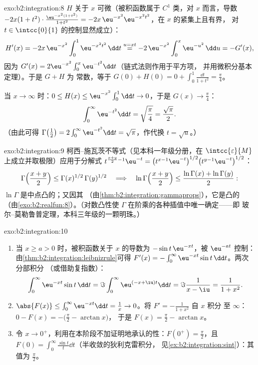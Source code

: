 \begin{solution}{exo:b2:integration:8}
$H$ 关于 $x$ 可微（被积函数属于 $C^1$ 类，对 $x$ 而言，导数
$-2x(1+t^2)\cdot\frac{\eu^{-x^2(1+t^2)}}{1+t^2} =
-2x\,\eu^{-x^2}\eu^{-x^2t^2}$，在 $x$ 的紧集上且有界，
对 $t \in \intcc{0}{1}$ 的控制显然成立）：
\[
H'(x) = -2x\,\eu^{-x^2}\int_0^1 \eu^{-x^2t^2}\,\dd t
\overset{u = xt}{=} -2\,\eu^{-x^2}\int_0^x \eu^{-u^2}\,\dd u
= -G'(x),
\]
因为 $G'(x) = 2\eu^{-x^2}\int_0^x \eu^{-t^2}\dd t$（链式法则作用于平方项，
并用微积分基本定理）。于是 $G + H$ 为
常数，等于 $G(0) + H(0) = 0 + \int_0^1 \frac{\dd t}{1+t^2}
= \frac\pi4$。

当 $x \to \infty$ 时：$0 \leq H(x) \leq \eu^{-x^2}\int_0^1 \dd t \to
0$，于是 $G(x) \to \frac\pi4$：
\[
\int_0^\infty \eu^{-t^2}\dd t = \sqrt{\frac\pi4} =
\frac{\sqrt\pi}{2} .
\]
（由此可得 $\Gamma\bigl(\frac12\bigr) = 2\int_0^\infty
\eu^{-t^2}\dd t = \sqrt\pi$，作代换 $t = \sqrt u$。）
\end{solution}

\begin{solution}{exo:b2:integration:9}
柯西--施瓦茨不等式（见本科一年级分册，在 $\intcc{\varepsilon}{M}$
上成立并取极限）应用于分解式
$t^{\frac{x+y}{2}-1}\eu^{-t} = \bigl(t^{x-1}\eu^{-t}\bigr)^{1/2}
\bigl(t^{y-1}\eu^{-t}\bigr)^{1/2}$：
\[
\Gamma\Bigl(\frac{x+y}{2}\Bigr) \leq
\Gamma(x)^{1/2}\,\Gamma(y)^{1/2}
\quad\Longrightarrow\quad
\ln\Gamma\Bigl(\frac{x+y}{2}\Bigr) \leq \frac{\ln\Gamma(x) +
\ln\Gamma(y)}{2} :
\]
$\ln\Gamma$ 是中点凸的；又因其
（由\cref{thm:b2:integration:gammaprops}），它是凸的
（由\cref{exo:b2:realfun:8}）。（对数凸性使 $\Gamma$
在阶乘的各种插值中唯一确定——即
玻尔–莫勒鲁普定理，本科三年级的一颗明珠。）
\end{solution}

\begin{solution}{exo:b2:integration:10}
\begin{enumerate}
  \item 当 $x \geq a > 0$ 时，被积函数关于 $x$ 的导数为
        $-\sin t\,\eu^{-xt}$，被 $\eu^{-at}$ 控制：
        由\cref{thm:b2:integration:leibnizrule}可得 $F'(x) =
        -\int_0^\infty \eu^{-xt}\sin t\,\dd t$。两次分部积分
        （或借助复指数）：
        \[
        \int_0^\infty \eu^{-xt}\sin t\,\dd t
        = \Im \int_0^\infty \eu^{(-x+\iu)t}\dd t
        = \Im\frac{1}{x - \iu} = \frac{1}{1 + x^2} .
        \]
  \item $\abs{F(x)} \leq \int_0^\infty \eu^{-xt}\dd t = \frac1x \to
        0$。将 $F' = -\frac{1}{1+x^2}$ 自 $x$ 积分
        至 $\infty$：$0 - F(x) = -\bigl(\frac\pi2 - \arctan x\bigr)$，
        于是 $F(x) = \frac\pi2 - \arctan x$。
  \item 令 $x \to 0^+$，利用在本阶段不加证明地承认的性：$F(0^+) =
        \frac\pi2$，且 $F(0) = \int_0^\infty \frac{\sin t}{t}\dd
        t$（半收敛的狄利克雷积分，
        见\cref{ex:b2:integration:sint}）：其值为
        $\frac\pi2$。
\end{enumerate}
\end{solution}

